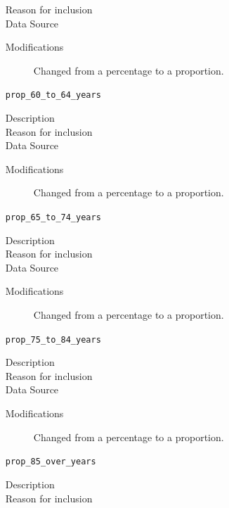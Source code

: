 \documentclass{article}
\begin{document}
\begin{itemize}[label={}, align=left]
\begin{description}
              \item[Reason for inclusion] \agereason
              \item[Data Source] \cite{acs_demographics_data}
              \item[Modifications] Changed from a percentage to a proportion.
          \end{description}
    \item[\texttt{prop\_60\_to\_64\_years}] \
          \begin{description}
              \item[Description] 
              \item[Reason for inclusion] \agereason
              \item[Data Source] \cite{acs_demographics_data}
              \item[Modifications] Changed from a percentage to a proportion.
          \end{description}
    \item[\texttt{prop\_65\_to\_74\_years}] \
          \begin{description}
              \item[Description] 
              \item[Reason for inclusion] \agereason
              \item[Data Source] \cite{acs_demographics_data}
              \item[Modifications] Changed from a percentage to a proportion.
          \end{description}
    \item[\texttt{prop\_75\_to\_84\_years}] \
          \begin{description}
              \item[Description] 
              \item[Reason for inclusion] \agereason
              \item[Data Source] \cite{acs_demographics_data}
              \item[Modifications] Changed from a percentage to a proportion.
          \end{description}
    \item[\texttt{prop\_85\_over\_years}] \
          \begin{description}
              \item[Description] \agedescover{85}
              \item[Reason for inclusion] \agereason

\end{description}
\end{itemize}
\end{document}
